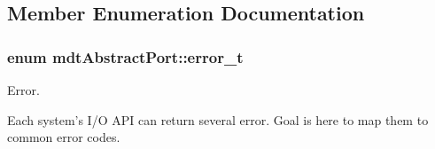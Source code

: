 \subsection{Member Enumeration Documentation}
\hypertarget{classmdt_abstract_port_ad4121bb930c95887e77f8bafa065a85e}{
\subsubsection[{error\-\_\-t}]{\setlength{\rightskip}{0pt plus 5cm}enum {\bf mdt\-Abstract\-Port\-::error\-\_\-t}}}\label{classmdt_abstract_port_ad4121bb930c95887e77f8bafa065a85e}


Error. 

Each system's I/\-O A\-P\-I can return several error. Goal is here to map them to common error codes.

